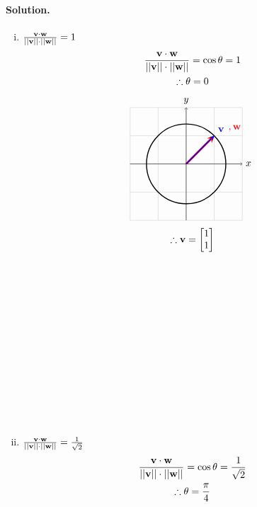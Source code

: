 \paragraph*{Solution.}
\begin{enumerate}[i.]
    \item $\frac{\vb{v}\cdot\vb{w}}{||\vb{v}||\cdot||\vb{w}||} = 1$\\
    \begin{gather*}
        \frac{\vb{v}\cdot\vb{w}}{||\vb{v}||\cdot||\vb{w}||} = \cos\theta = 1\\\therefore\theta = 0
    \end{gather*}
    \begin{gather*}
        \begin{tikzpicture}
            \coordinate (O) at (0,0);
            \draw[thin,gray!40] (-2,-2) grid (2,2);
            \draw[->] (-2,0)--(2,0) node[right]{$x$};
            \draw[->] (0,-2)--(0,2) node[above]{$y$};
            \draw[black, line width=1pt] (0,0) circle (1.414213); %
            \draw[line width=2pt,red,-stealth](0,0)--(1,1) node[anchor=south west]{$\quad,\vb{w}$};
            \draw[line width=1pt,blue,-stealth](0,0)--(1,1) node[anchor=south west]{$\vb{v}$};
        \end{tikzpicture}\\
        \therefore \vb{v} = \begin{bmatrix}
            1\\1
        \end{bmatrix}
    \end{gather*}
    \\\\\\\\\\\\\\\\\\\\\\\\
    \item $\frac{\vb{v}\cdot\vb{w}}{||\vb{v}||\cdot||\vb{w}||} = \frac{1}{\sqrt{2}}$\\
    \begin{gather*}
        \frac{\vb{v}\cdot\vb{w}}{||\vb{v}||\cdot||\vb{w}||} = \cos\theta = \frac{1}{\sqrt{2}}\\
        \therefore\theta=\frac{\pi}{4}
    \end{gather*}

\end{enumerate}
